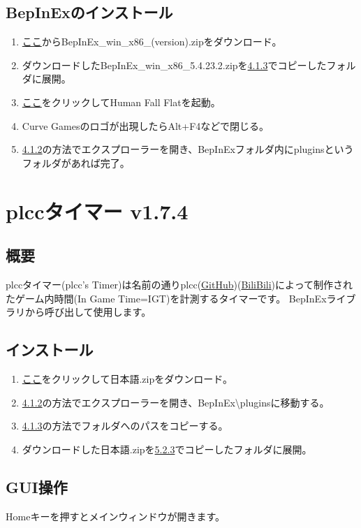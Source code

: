 \documentclass[lualatex,a4paper,fontsize=11pt,jafontscale=0.9247,titlepage,oneside]{jlreq}
\begin{document}
\subsection{BepInExのインストール}
\begin{enumerate}
\item \href{https://github.com/BepInEx/BepInEx/releases/latest}{ここ}からBepInEx\_win\_x86\_(version).zipをダウンロード。
\item ダウンロードしたBepInEx\_win\_x86\_5.4.23.2.zipを\hyperref[4.1.3]{4.1.3}でコピーしたフォルダに展開。
\item \href{steam://rungameid/477160}{ここ}をクリックしてHuman Fall Flatを起動。
\item Curve Gamesのロゴが出現したらAlt+F4などで閉じる。
\item \hyperref[4.1.2]{4.1.2}の方法でエクスプローラーを開き、BepInExフォルダ内にpluginsというフォルダがあれば完了。
\end{enumerate}
\section{plccタイマー v1.7.4}
\subsection{概要}
plccタイマー(plcc's Timer)は名前の通りplcc(\href{https://github.com/plcc0}{GitHub})(\href{https://space.bilibili.com/111277972}{BiliBili})によって制作されたゲーム内時間(In Game Time=IGT)を計測するタイマーです。\parr
BepInExライブラリから呼び出して使用します。
\subsection{インストール}
\begin{enumerate}   
\item \href{https://github.com/Msgame79/hffmods/raw/refs/heads/main/plcc's%20timer/1.7.4/%E6%97%A5%E6%9C%AC%E8%AA%9E.zip}{ここ}をクリックして日本語.zipをダウンロード。
\item \hyperref[4.1.2]{4.1.2}の方法でエクスプローラーを開き、BepInEx\textbackslash pluginsに移動する。
\item \label{5.2.3}\hyperref[4.1.3]{4.1.3}の方法でフォルダへのパスをコピーする。
\item ダウンロードした日本語.zipを\hyperref[5.2.3]{5.2.3}でコピーしたフォルダに展開。
\end{enumerate}
\subsection{GUI操作}
Homeキーを押すとメインウィンドウが開きます。
\end{document}
